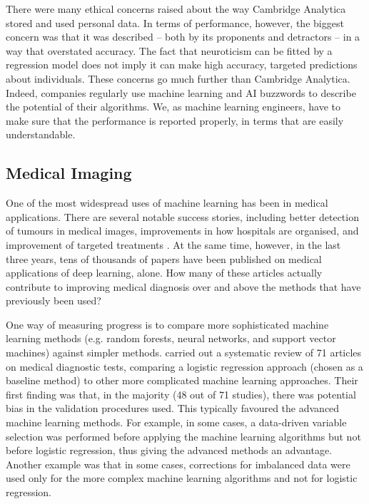 There were many ethical concerns raised about the way Cambridge Analytica stored and used personal data. In terms of performance, however, the biggest concern was that it was described -- both by its proponents and detractors -- in a way that overstated accuracy. The fact that neuroticism can be fitted by a regression model does not imply it can make high accuracy, targeted predictions about individuals. These concerns go much further than Cambridge Analytica. Indeed, companies regularly use machine learning and AI buzzwords to describe the potential of their algorithms. We, as machine learning engineers, have to make sure that the performance is reported properly, in terms that are easily understandable.

\subsection{Medical Imaging}

One of the most widespread uses of machine learning has been in medical applications. There are several notable success stories, including better detection of tumours in medical images, improvements in how hospitals are organised, and improvement of targeted treatments \parencite{vollmer2020machine}. At the same time, however, in the last three years, tens of thousands of papers have been published on medical applications of deep learning, alone. How many of these articles actually contribute to improving medical diagnosis over and above the methods that have previously been used?

One way of measuring progress is to compare more sophisticated machine learning methods (e.g. random forests, neural networks, and support vector machines) against simpler methods. \textcite{christodoulou2019systematic} carried out a systematic review of 71 articles on medical diagnostic tests, comparing a logistic regression approach (chosen as a baseline method) to other more complicated machine learning approaches. Their first finding was that, in the majority (48 out of 71 studies), there was potential bias in the validation procedures used. This typically favoured the advanced machine learning methods. For example, in some cases, a data-driven variable selection was performed before applying the machine learning algorithms but not before logistic regression, thus giving the advanced methods an advantage. Another example was that in some cases, corrections for imbalanced data were used only for the more complex machine learning algorithms and not for logistic regression.

